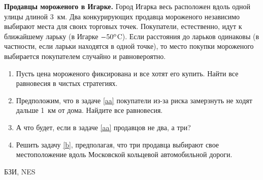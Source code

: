 \begin{problem}
 {\bf Продавцы мороженого в Игарке.} Город Игарка весь
расположен вдоль одной улицы длиной 3~км. Два конкурирующих
продавца мороженого независимо выбирают места для своих
торговых точек. Покупатели, естественно, идут к ближайшему
ларьку (в Игарке $-50^{\rm o}$C). Если расстояния до
ларьков одинаковы (в частности, если ларьки находятся в
одной точке), то место покупки мороженого выбирается
покупателем случайно и равновероятно.

\begin{enumerate}

\item\label{aa} Пусть цена мороженого фиксирована и все
хотят его купить. Найти все равновесия в чистых стратегиях.

\item Предположим, что в задаче \ref{aa} покупатели из-за
риска замерзнуть не ходят дальше 1~км от дома. Найдите все
равновесия.

\item\label{b} А что будет, если в задаче \ref{aa}
продавцов не два, а три?

\item Решить задачу \ref{b}, предполагая, что три продавца
выбирают свое местоположение вдоль Московской кольцевой
автомобильной дороги.

\end{enumerate}




\begin{source}
БЗИ, NES
\end{source}


\begin{sol}

\end{sol}
\end{problem}





